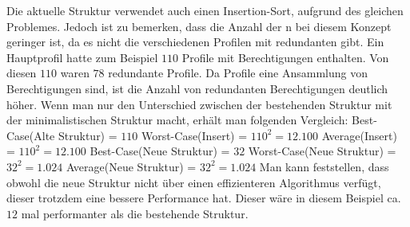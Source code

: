 Die aktuelle Struktur verwendet auch einen Insertion-Sort, aufgrund des gleichen Problemes.
Jedoch ist zu bemerken, dass die Anzahl der n bei diesem Konzept geringer ist, da es nicht die verschiedenen Profilen mit redundanten gibt.
\newline
\newline
Ein Hauptprofil hatte zum Beispiel $110$ Profile mit Berechtigungen enthalten.
Von diesen $110$ waren $78$ redundante Profile.
Da Profile eine Ansammlung von Berechtigungen sind, ist die Anzahl von redundanten Berechtigungen deutlich höher.
Wenn man nur den Unterschied zwischen der bestehenden Struktur mit der minimalistischen Struktur macht, erhält man folgenden Vergleich:
\newline
\newline
Best-Case(Alte Struktur) = $110$
\newline
Worst-Case(Insert) = $110^2 = 12.100$
\newline
Average(Insert) = $110^2 = 12.100$
\newline
\newline
Best-Case(Neue Struktur) = $32$
\newline
Worst-Case(Neue Struktur) = $32^2 = 1.024$
\newline
Average(Neue Struktur) = $32^2 = 1.024$
\newline
\newline
Man kann feststellen, dass obwohl die neue Struktur nicht über einen effizienteren Algorithmus verfügt, dieser trotzdem eine bessere Performance hat.
Dieser wäre in diesem Beispiel ca. $12$ mal performanter als die bestehende Struktur.